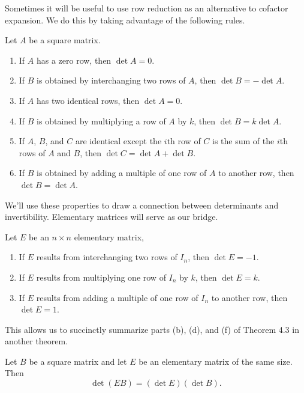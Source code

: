 \documentclass[../m73main.tex]{subfiles}
\begin{document}
Sometimes it will be useful to use row reduction as an alternative to cofactor expansion.
We do this by taking advantage of the following rules.

\begin{theorem}
	Let $A$ be a square matrix.
	\begin{enumerate}[label=(\alph*)]
		\item If $A$ has a zero row, then $\det A = 0$.
		\item If $B$ is obtained by interchanging two rows of $A$, then $\det B = -\det A$.
		\item If $A$ has two identical rows, then $\det A = 0$.
		\item If $B$ is obtained by multiplying a row of $A$ by $k$, then $\det B = k \det A$.
		\item If $A$, $B$, and $C$ are identical except the $i$th row of $C$ is the sum of the $i$th rows of $A$ and $B$, then $\det C = \det A + \det B$.
		\item If $B$ is obtained by adding a multiple of one row of $A$ to another row, then $\det B = \det A$.
	\end{enumerate}
\end{theorem}

We'll use these properties to draw a connection between determinants and invertibility.
Elementary matrices will serve as our bridge.

\begin{theorem}
	Let $E$ be an $n \times n$ elementary matrix,
	\begin{enumerate}[label=(\alph*)]
		\item If $E$ results from interchanging two rows of $I_n$, then $\det E = -1$.
		\item If $E$ results from multiplying one row of $I_n$ by $k$, then $\det E = k$.
		\item If $E$ results from adding a multiple of one row of $I_n$ to another row, then $\det E = 1$.
	\end{enumerate}
\end{theorem}

This allows us to succinctly summarize parts (b), (d), and (f) of Theorem 4.3 in another theorem.

\begin{lemma}
	Let $B$ be a square matrix and let $E$ be an elementary matrix of the same size.
	Then
	\[ \det (EB) = (\det E)(\det B). \]
\end{lemma}
\end{document}
